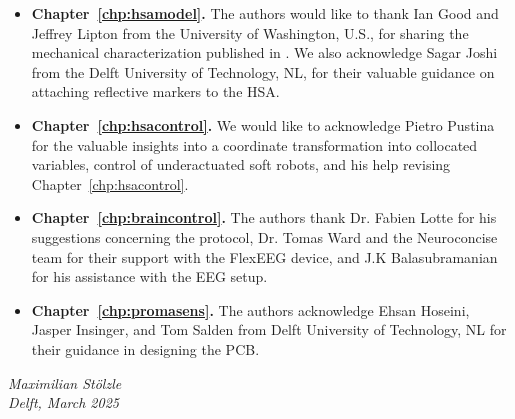 \begin{itemize}
    \item \textbf{Chapter~\ref{chp:hsamodel}.} The authors would like to thank Ian Good and Jeffrey Lipton from the University of Washington, U.S., for sharing the mechanical characterization published in \citep{good2022expanding}. We also acknowledge Sagar Joshi from the Delft University of Technology, NL, for their valuable guidance on attaching reflective markers to the HSA.
    \item \textbf{Chapter~\ref{chp:hsacontrol}.} We would like to acknowledge Pietro Pustina for the valuable insights into a coordinate transformation into collocated variables, control of underactuated soft robots, and his help revising Chapter~\ref{chp:hsacontrol}.
    \item \textbf{Chapter~\ref{chp:braincontrol}.} The authors thank Dr. Fabien Lotte for his suggestions concerning the protocol, Dr. Tomas Ward and the Neuroconcise team for their support with the FlexEEG device, and J.K Balasubramanian for his assistance with the EEG setup.
    \item \textbf{Chapter~\ref{chp:promasens}.} The authors acknowledge Ehsan Hoseini, Jasper Insinger, and Tom Salden from Delft University of Technology, NL for their guidance in designing the \gls{PCB}.
\end{itemize}

\begin{flushright}
{\makeatletter\itshape
    Maximilian Stölzle \\
    Delft, March 2025
\makeatother}
\end{flushright}


